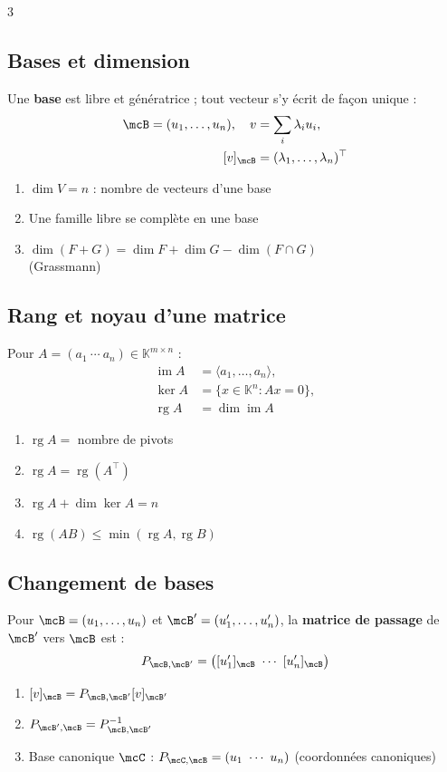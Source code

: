 \documentclass[12pt, a4paper]{article}
\newcommand{\KK}{\mathbb{K}}
\newcommand{\rg}{\operatorname{rg}}
\newcommand{\im}{\operatorname{im}}
\begin{document}
\begin{multicols*}{3}
\colbreak
\subsection{Bases et dimension}
Une \textbf{base} est libre et génératrice ; tout vecteur s'y écrit de façon unique :
\begin{align*}
\mcB=(u_1,\ldots,u_n),\quad
v&=\sum_i\lambda_i u_i,\\
[v]_{\mcB}&=(\lambda_1,\ldots,\lambda_n)^\top
\end{align*}
\begin{enumerate}
\item $\dim V=n$ : nombre de vecteurs d'une base
\item Une famille libre se complète en une base
\item $\dim(F+G)=\dim F+\dim G-\dim(F\cap G)$\\\hfill(Grassmann)
\end{enumerate}

\subsection{Rang et noyau d'une matrice}
Pour $A=(a_1\ \cdots\ a_n)\in\KK^{m\times n}$ :
\begin{align*}
\im A&=\langle a_1,\ldots,a_n\rangle,\\
\ker A&=\{x\in\KK^n:Ax=0\},\\
\rg A&=\dim\im A
\end{align*}
\begin{enumerate}
\item $\rg A=$ nombre de pivots
\item $\rg A=\rg(A^\top)$
\item $\rg A+\dim\ker A=n$
\item $\rg(AB)\le\min(\rg A,\rg B)$
\end{enumerate}

\subsection{Changement de bases}
Pour $\mcB=(u_1,\ldots,u_n)$ et $\mcB'=(u'_1,\ldots,u'_n)$, la \textbf{matrice de passage} de $\mcB'$ vers $\mcB$ est :
\begin{align*}
P_{\mcB,\mcB'}=\bigl([u'_1]_{\mcB}\ \cdots\ [u'_n]_{\mcB}\bigr)
\end{align*}
\begin{enumerate}
\item $[v]_{\mcB}=P_{\mcB,\mcB'}[v]_{\mcB'}$
\item $P_{\mcB',\mcB}=P_{\mcB,\mcB'}^{-1}$
\item Base canonique $\mcC$ : $P_{\mcC,\mcB}=(u_1\ \cdots\ u_n)$ (coordonnées canoniques)
\end{enumerate}


\end{multicols*}
\end{document}
